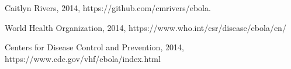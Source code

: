 \documentclass[%
 reprint,
superscriptaddress,
 amsmath,amssymb,
 aps,
floatfix,
]{revtex4-2}
\begin{document}
\newpage
\begin{thebibliography}{2}

 Caitlyn Rivers, 2014, https://github.com/cmrivers/ebola.

 World Health Organization, 2014, https://www.who.int/csr/disease/ebola/en/

 Centers for Disease Control and Prevention, 2014, https://www.cdc.gov/vhf/ebola/index.html

\end{thebibliography}
\end{document}
